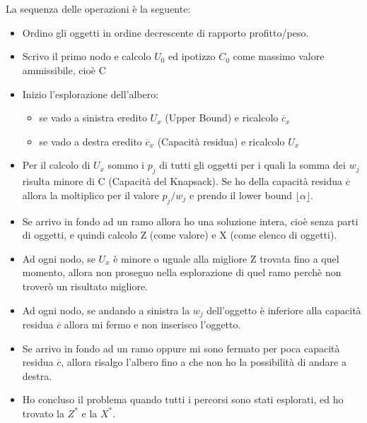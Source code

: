 \documentclass{article}
\begin{document}
\begin{center}
\end{center}
~\\
~\\
La sequenza delle operazioni è la seguente:
\begin{itemize}
\item Ordino gli oggetti in ordine decrescente di rapporto profitto/peso.
\item Scrivo il primo nodo e calcolo $U_0$ ed ipotizzo $C_0$ come massimo valore ammissibile, cioè C
\item Inizio l'esplorazione dell'albero:
\begin{itemize}
\item se vado a sinistra eredito $U_x$ (Upper Bound) e ricalcolo $\overline{c}_x$
\item se vado a destra eredito $\overline{c}_x$ (Capacità residua) e ricalcolo $U_x$
\end{itemize}
\item Per il calcolo di $U_x$ sommo i $p_j$ di tutti gli oggetti per i quali la somma dei $w_j$ risulta minore di C (Capacità del Knapsack). Se ho della capacità residua $\overline{c}$ allora la moltiplico per il valore $p_j/w_j$ e prendo il lower bound $\lfloor \alpha \rfloor$.
\item Se arrivo in fondo ad un ramo allora ho una soluzione intera, cioè senza parti di oggetti, e quindi calcolo Z (come valore) e X (come elenco di oggetti).
\item Ad ogni nodo, se $U_x$ è minore o uguale alla migliore Z trovata fino a quel momento, allora non proseguo nella esplorazione di quel ramo perchè non troverò un risultato migliore.
\item Ad ogni nodo, se andando a sinistra la $w_j$ dell'oggetto è inferiore alla capacità residua $\overline{c}$ allora mi fermo e non inserisco l'oggetto.
\item Se arrivo in fondo ad un ramo oppure mi sono fermato per poca capacità residua $\overline{c}$, allora risalgo l'albero fino a che non ho la possibilità di andare a destra.
\item Ho concluso il problema quando tutti i percorsi sono stati esplorati, ed ho trovato la $Z^*$ e la $X^*$.
\end{itemize}
\end{document}
